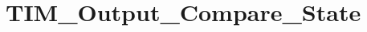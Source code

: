 \hypertarget{group___t_i_m___output___compare___state}{\section{T\-I\-M\-\_\-\-Output\-\_\-\-Compare\-\_\-\-State}
\label{group___t_i_m___output___compare___state}
}
